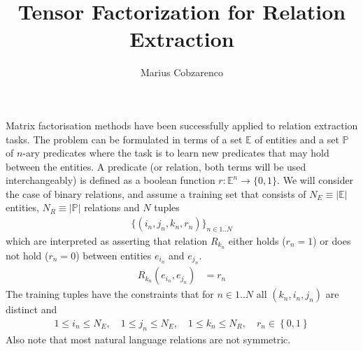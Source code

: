 \documentclass[a4paper, 12pt, fleqn]{article}
\begin{document}
 \title{Tensor Factorization for Relation Extraction}
\author{Marius Cobzarenco}
\maketitle


Matrix factorisation methods have been successfully applied to
relation extraction tasks. The problem can be formulated in terms of a
set $\mathbb{E}$ of entities and a set $\mathbb{P}$ of $n$-ary
predicates where the task is to learn new predicates that may hold
between the entities. A predicate (or relation, both terms will be
used interchangeably) is defined as a boolean function $r:\mathbb{E}^n
\rightarrow \{0, 1\}$. We will consider the case of binary relations,
and assume a training set that consists of $ N_E \equiv
\vert\mathbb{E}\vert$ entities, $N_R \equiv \vert\mathbb{P}\vert$
relations and $N$ tuples
\begin{align}
\{(i_n, j_n, k_n, r_n)\}_{n\in\overline{1..N}}
\end{align}
which are interpreted as asserting that relation $R_{k_n}$ either
holds ($r_n = 1$) or does not hold ($r_n = 0$) between entities
$e_{i_n}$ and $e_{j_n}$.
\begin{align}
R_{k_n}(e_{i_n}, e_{j_n}) &= r_n
\end{align}
The training tuples have the constraints that for $n\in{1..N}$ all
$(k_n, i_n, j_n)$ are distinct and
\begin{align}
1 \leq i_n \leq N_E, \quad 1 \leq j_n \leq N_E, \quad
1 \leq k_n \leq N_R,\quad r_n \in \left\{0, 1\right\}
\end{align}
Also note that most natural language relations are not symmetric.
\end{document}
